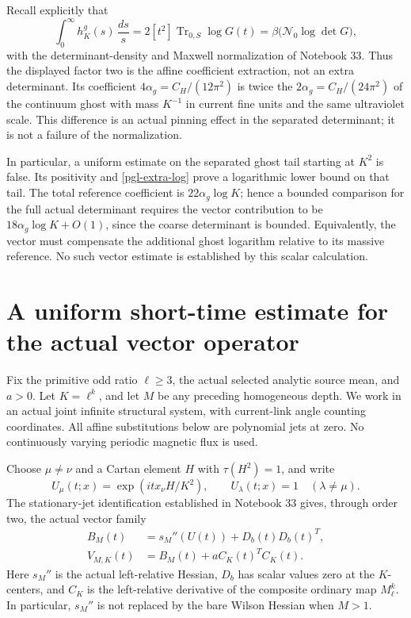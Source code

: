 \documentclass[11pt]{article}
\theoremstyle{remark}
\begin{document}
Recall explicitly that
\[
 \int_0^\infty h_K^g(s)\,\frac{ds}{s}
   =2[t^2]\operatorname{Tr}_{0,S}\log G(t)
   =\beta\bigl(\mathcal N_0\log\det G\bigr),
\]
with the determinant-density and Maxwell normalization
of Notebook 33. Thus the displayed factor two is the
affine coefficient extraction, not an extra determinant.
Its coefficient \(4\alpha_g=C_H/(12\pi^2)\) is
twice the \(2\alpha_g=C_H/(24\pi^2)\) of the
continuum ghost with mass \(K^{-1}\) in current
fine units and the same ultraviolet scale.
This difference is an actual pinning effect in the
separated determinant; it is not a failure of the
normalization.

In particular, a uniform estimate on the separated
ghost tail starting at \(K^2\) is false. Its positivity
and \eqref{pgl-extra-log} prove a logarithmic lower
bound on that tail. The total reference coefficient
is \(22\alpha_g\log K\); hence a bounded comparison
for the full actual determinant requires the vector
contribution to be \(18\alpha_g\log K+O(1)\), since
the coarse determinant is bounded. Equivalently,
the vector must compensate the additional ghost
logarithm relative to its massive reference.
No such vector estimate is established by this
scalar calculation.


\section{A uniform short-time estimate for the actual vector operator}
\label{vst-section}

Fix the primitive odd ratio \(\ell\ge3\), the actual selected analytic
source mean, and \(a>0\). Let \(K=\ell^k\), and let \(M\) be any
preceding homogeneous depth. We work in an actual joint infinite
structural system, with current-link angle counting coordinates.
All affine substitutions below are polynomial jets at zero.
No continuously varying periodic magnetic flux is used.

Choose \(\mu\ne\nu\) and a Cartan element \(H\) with
\(\tau(H^2)=1\), and write
\[
 U_\mu(t;x)=\exp(i t x_\nu H/K^2),\qquad U_\lambda(t;x)=1
                       \quad(\lambda\ne\mu).
\]
The stationary-jet identification established in Notebook 33 gives,
through order two, the actual vector family
\begin{equation}
 \begin{split}
 B_M(t)&=s_M''(U(t))+D_b(t)D_b(t)^T,\\
 V_{M,K}(t)&=B_M(t)+aC_K(t)^TC_K(t).
 \end{split}
 \label{vst-operators}
\end{equation}
Here \(s_M''\) is the actual left-relative Hessian,
\(D_b\) has scalar values zero at the \(K\)-centers, and \(C_K\)
is the left-relative derivative of the composite ordinary map
\(M_\ell^k\). In particular, \(s_M''\) is not replaced by the
bare Wilson Hessian when \(M>1\).
\end{document}
